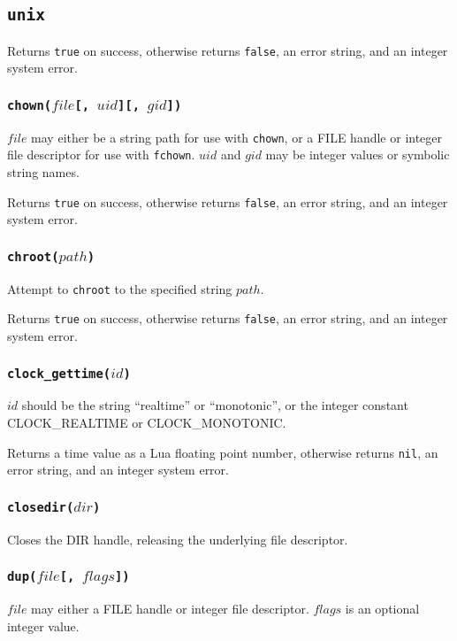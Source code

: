 \documentclass[11pt, oneside]{memoir}
\newcommand*{\true}[0]{\texttt{true}\xspace}
\newcommand*{\false}[0]{\texttt{false}\xspace}
\newcommand*{\nil}[0]{\texttt{nil}\xspace}
\newcommand*{\syscall}[1]{\texttt{#1}\xspace}
\newcommand*{\fn}[1]{\texttt{#1}\xspace}
\newcounter{toccols}
\newenvironment{Module}[1]{
	\subsection{\texttt{#1}}
	\addtocontents{toc}{
		\protect\begin{multicols}{\value{toccols}}
	}
}{
	\addtocontents{toc}{\protect\end{multicols}}
}
\begin{document}
\begin{Module}{unix}
Returns \true on success, otherwise returns \false, an error string, and an integer system error.

\subsubsection[\fn{chown}]{\fn{chown($file$[, $uid$][, $gid$])}}

$file$ may either be a string path for use with \syscall{chown}, or a FILE handle or integer file descriptor for use with \syscall{fchown}. $uid$ and $gid$ may be integer values or symbolic string names.

Returns \true on success, otherwise returns \false, an error string, and an integer system error.

\subsubsection[\fn{chroot}]{\fn{chroot($path$)}}

Attempt to \syscall{chroot} to the specified string $path$.

Returns \true on success, otherwise returns \false, an error string, and an integer system error.

\subsubsection[\fn{clock\_gettime}]{\fn{clock\_gettime($id$)}}

$id$ should be the string ``realtime'' or ``monotonic'', or the integer constant CLOCK\_REALTIME or CLOCK\_MONOTONIC.

Returns a time value as a Lua floating point number, otherwise returns \nil, an error string, and an integer system error.

\subsubsection[\fn{closedir}]{\fn{closedir($dir$)}}

Closes the DIR handle, releasing the underlying file descriptor.

\subsubsection[\fn{dup}]{\fn{dup($file$[, $flags$])}}

$file$ may either a FILE handle or integer file descriptor. $flags$ is an optional integer value.


\end{Module}
\end{document}
